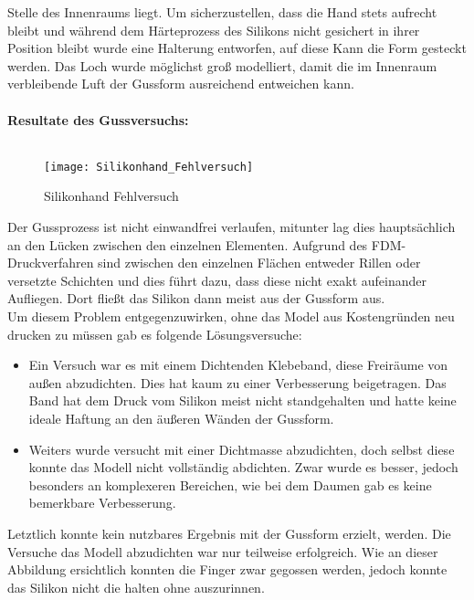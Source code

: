 \documentclass[titlepage,12pt,twoside]{article}
\begin{document}
Stelle des Innenraums liegt. Um sicherzustellen, dass die Hand stets aufrecht bleibt und während dem Härteprozess des Silikons nicht gesichert in ihrer Position bleibt wurde eine Halterung entworfen, auf diese Kann die Form gesteckt werden. Das Loch 
wurde möglichst groß modelliert, damit die im Innenraum verbleibende Luft der Gussform ausreichend entweichen kann. \\
\\
\textbf{Resultate des Gussversuchs:} \\
\\
\begin{figure}[H]
	\begin{center}
		\scalebox{0.8}
		{\texttt{[image: Silikonhand\_Fehlversuch]}}
		\caption{Silikonhand Fehlversuch}
		\label{fig:Silikonhand_Fehlversuch}			
	\end{center}
\end{figure}
\hfill \break
Der Gussprozess ist nicht einwandfrei verlaufen, mitunter lag dies hauptsächlich an den Lücken zwischen den einzelnen Elementen. Aufgrund des FDM-Druckverfahren sind zwischen den einzelnen Flächen entweder Rillen oder versetzte Schichten und dies 
führt dazu, dass diese nicht exakt aufeinander Aufliegen. Dort fließt das Silikon dann meist aus der Gussform aus. \\
Um diesem Problem entgegenzuwirken, ohne das Model aus Kostengründen neu drucken zu müssen gab es folgende Lösungsversuche:
\begin{itemize}
	\item Ein Versuch war es mit einem Dichtenden Klebeband, diese Freiräume von außen abzudichten. Dies hat kaum zu einer Verbesserung beigetragen. Das Band hat dem Druck vom Silikon meist nicht standgehalten und hatte keine ideale Haftung an 
	den äußeren Wänden der Gussform.
	\item Weiters wurde versucht mit einer Dichtmasse abzudichten, doch selbst diese konnte das Modell nicht vollständig abdichten. Zwar wurde es besser, jedoch besonders an komplexeren Bereichen, wie bei dem Daumen gab es keine bemerkbare Verbesserung.
\end{itemize}
\hfill \break
Letztlich konnte kein nutzbares Ergebnis mit der Gussform erzielt, werden. Die Versuche das Modell abzudichten war nur teilweise erfolgreich. Wie an dieser Abbildung ersichtlich konnten die Finger zwar gegossen werden, jedoch konnte das Silikon 
nicht die  halten ohne auszurinnen. \\
\\
\end{document}
